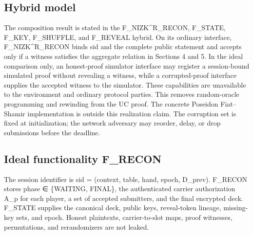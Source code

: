 \documentclass[11pt]{article}
\begin{document}
\subsection{Hybrid model}

The composition result is stated in the F\_NIZK\^{}R\_RECON, F\_STATE, F\_KEY, F\_SHUFFLE, and F\_REVEAL hybrid. On its ordinary interface, F\_NIZK\^{}R\_RECON binds sid and the complete public statement and accepts only if a witness satisfies the aggregate relation in Sections 4 and 5. In the ideal comparison only, an honest-proof simulator interface may register a session-bound simulated proof without revealing a witness, while a corrupted-proof interface supplies the accepted witness to the simulator. These capabilities are unavailable to the environment and ordinary protocol parties. This removes random-oracle programming and rewinding from the UC proof. The concrete Poseidon Fiat–Shamir implementation is outside this realization claim. The corruption set is fixed at initialization; the network adversary may reorder, delay, or drop submissions before the deadline.

\subsection{Ideal functionality F\_RECON}

The session identifier is sid = (context, table, hand, epoch, D\_prev). F\_RECON stores phase ∈ \{WAITING, FINAL\}, the authenticated carrier authorization A\_p for each player, a set of accepted submitters, and the final encrypted deck. F\_STATE supplies the canonical deck, public keys, reveal-token lineage, missing-key sets, and epoch. Honest plaintexts, carrier-to-slot maps, proof witnesses, permutations, and rerandomizers are not leaked.
\end{document}
